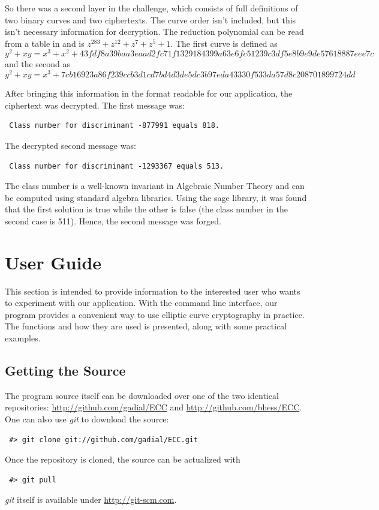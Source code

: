\documentclass[11pt,english]{article}
\begin{document}
So there was a second layer in the challenge, which consists of full definitions of two binary curves and two ciphertexts. The curve order isn't included, but this isn't necessary information for decryption. The reduction polynomial can be read from a table in \cite{940321} and is $z^{283}+z^{12}+z^7+z^5+1$. The first curve is defined as
\begin{displaymath}
 y^2 + xy = x^3 + x^2 + 43fdf8a39baa3eaad2fc71f1329184399a63e6fc51239c3df5e8b9e9de57618887eee7c
\end{displaymath}
and the second as 
\begin{displaymath}
 y^2 + xy = x^3 + 7cb16923a86f239ccb3d1cd7bd4d3de5dc3b97eda43330f533da57d8c208701899724dd
\end{displaymath}

After bringing this information in the format readable for our application, the ciphertext was decrypted. The first message was:

\begin{verbatim}
 Class number for discriminant -877991 equals 818.
\end{verbatim}

The decrypted second message was:

\begin{verbatim}
 Class number for discriminant -1293367 equals 513.
\end{verbatim}

The class number is a well-known invariant in Algebraic Number Theory and can be computed using standard algebra libraries. Using the sage library, it was found that the first solution is true while the other is false (the class number in the second case is 511). Hence, the second message was forged.

\section{User Guide}
\label{User Guide}
This section is intended to provide information to the interested user who wants to experiment with our application.
With the command line interface, our program provides a convenient way to use elliptic curve cryptography in practice. The functions and how they are used is presented, along with some practical examples.

\subsection{Getting the Source}
The program source itself can be downloaded over one of the two identical repositories: \url{http://github.com/gadial/ECC} and \url{http://github.com/bhess/ECC}. One can also use \emph{git} to download the source:
\begin{verbatim}
 #> git clone git://github.com/gadial/ECC.git
\end{verbatim}
Once the repository is cloned, the source can be actualized with
\begin{verbatim}
 #> git pull
\end{verbatim}
\emph{git} itself is available under \url{http://git-scm.com}.
\end{document}
